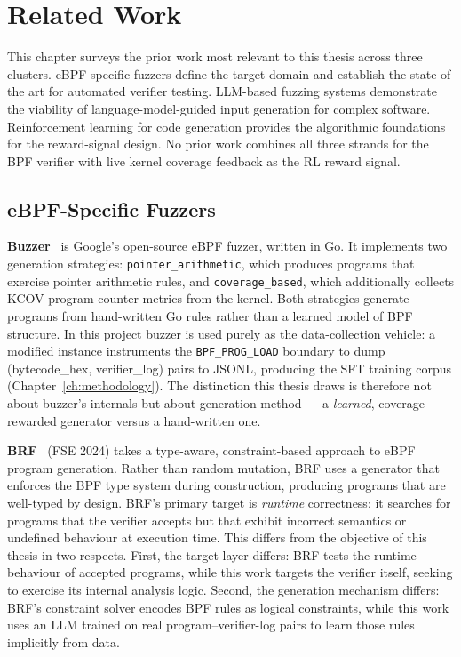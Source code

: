 \chapter{Related Work}
\label{ch:related-work}

This chapter surveys the prior work most relevant to this thesis across three
clusters.
eBPF-specific fuzzers define the target domain and establish the state of the art
for automated verifier testing.
LLM-based fuzzing systems demonstrate the viability of language-model-guided input
generation for complex software.
Reinforcement learning for code generation provides the algorithmic foundations
for the reward-signal design.
No prior work combines all three strands for the BPF verifier with live kernel
coverage feedback as the RL reward signal.

\section{eBPF-Specific Fuzzers}
\label{sec:rw-ebpf}

\textbf{Buzzer}~\cite{buzzer} is Google's open-source eBPF fuzzer, written in Go.
It implements two generation strategies: \texttt{pointer\_arithmetic}, which
produces programs that exercise pointer arithmetic rules, and
\texttt{coverage\_based}, which additionally collects KCOV program-counter metrics
from the kernel. Both strategies generate programs from hand-written Go rules
rather than a learned model of BPF structure. In this project buzzer is used purely
as the data-collection vehicle: a modified instance instruments the
\texttt{BPF\_PROG\_LOAD} boundary to dump (bytecode\_hex, verifier\_log) pairs to
JSONL, producing the SFT training corpus (Chapter~\ref{ch:methodology}). The
distinction this thesis draws is therefore not about buzzer's internals but about
generation method --- a \emph{learned}, coverage-rewarded generator versus a
hand-written one.

\textbf{BRF}~\cite{brf} (FSE 2024) takes a type-aware, constraint-based approach
to eBPF program generation.
Rather than random mutation, BRF uses a generator that enforces the BPF type
system during construction, producing programs that are well-typed by design.
BRF's primary target is \emph{runtime} correctness: it searches for programs
that the verifier accepts but that exhibit incorrect semantics or undefined
behaviour at execution time.
This differs from the objective of this thesis in two respects.
First, the target layer differs: BRF tests the runtime behaviour of accepted
programs, while this work targets the verifier itself, seeking to exercise its
internal analysis logic.
Second, the generation mechanism differs: BRF's constraint solver encodes BPF
rules as logical constraints, while this work uses an LLM trained on real
program--verifier-log pairs to learn those rules implicitly from data.


